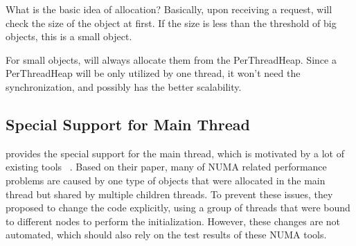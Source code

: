 What is the basic idea of allocation? 
Basically, upon receiving a request, \NM{} will check the size of the object at first. If the size is less than the threshold of big objects, this is a small object. 

For small objects, \NM{} will always allocate them from the PerThreadHeap. Since a PerThreadHeap will be only utilized by one thread, it won't need the synchronization, and possibly has the better scalability. 

\subsection{Special Support for Main Thread}
\NM{} provides the special support for the main thread, which is motivated by a lot of existing tools ~\cite{XULIU, MemProf}. Based on their paper, many of NUMA related performance problems are caused by one type of objects that were allocated in the main thread but shared by multiple children threads. To prevent these issues, they proposed to change the code explicitly, using a group of threads that were bound to different nodes to perform the initialization. However, these changes are not automated, which should also rely on the test results of these NUMA tools.  





